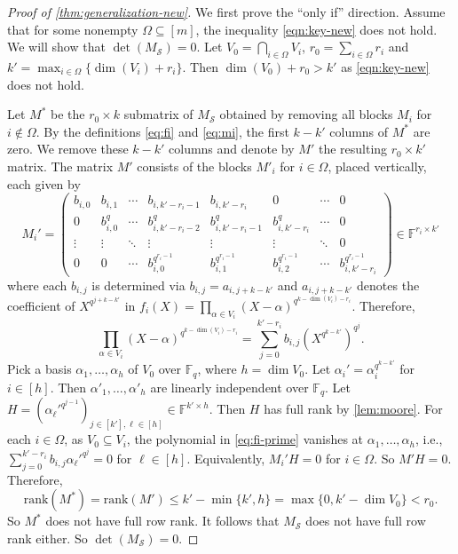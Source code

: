 \documentclass[11pt]{article}
\theoremstyle{plain}
\theoremstyle{definition}
\theoremstyle{remark}
\newcommand{\F}{\mathbb{F}}
\newcommand{\cS}{\mathcal{S}}
\newcommand{\rank}{\mathrm{rank}}
\begin{document}
\begin{proof}[Proof of \cref{thm:generalization-new}]
We first prove the ``only if'' direction.
Assume that for some nonempty $\Omega\subseteq [m]$, the inequality \eqref{eqn:key-new} does not hold. We will show that $\det(M_{\cS})=0$.
Let $V_0=\bigcap_{i\in \Omega}V_i$, $r_0=\sum_{i\in \Omega}r_i$ and $k'=\max_{i\in \Omega}\{\dim(V_i)+r_i\}$. Then $\dim(V_0)+r_0>k'$ as \eqref{eqn:key-new} does not hold. 

Let $M^*$ be the  $r_0\times k$ submatrix of $M_{\cS}$ obtained by removing all blocks $M_i$ for $i\notin \Omega$. 
By the definitions \eqref{eq:fi} and \eqref{eq:mi}, the first $k-k'$ columns of $M^*$ are zero. We remove these $k-k'$ columns and denote by $M'$ the resulting $r_0\times k'$ matrix. The matrix $M'$ consists of the blocks $M'_i$ for $i\in \Omega$, placed vertically, each given by
\begin{equation}\label{eq:mi-prime}
M_i'=\begin{pmatrix}
b_{i,0}&b_{i,1}&\cdots& b_{i,k'-r_i-1} & b_{i,k'-r_i}&  0 & \cdots &0   \\
0 &b_{i,0}^q& \cdots  & b_{i,k'-r_i-2}^q & b_{i,k'-r_i-1}^q & b_{i,k'-r_i}^q & \cdots &0 \\
\vdots & \vdots &\ddots & \vdots &\vdots &\vdots& \ddots &0\\
0 &0  & \cdots &b_{i,0}^{q^{r_i-1}} & b_{i,1}^{q^{r_i-1}} & b_{i,2}^{q^{r_i-1}} &\cdots & b_{i,k'-r_i}^{q^{r_i-1}} 
\end{pmatrix}\in\mathbb{F}^{r_i\times k'}
\end{equation}
where each $b_{i,j}$ is determined via  $b_{i,j}=a_{i,j+k-k'}$ and $a_{i,j+k-k'}$ denotes the coefficient of $X^{q^{j+k-k'}}$ in $f_i(X)=\prod_{\alpha\in V_i}(X-\alpha)^{q^{k-\dim(V_i)-r_i}}$. Therefore,
\begin{equation}\label{eq:fi-prime}
\prod_{\alpha\in V_i}(X-\alpha)^{q^{k-\dim(V_i)-r_i}}=\sum_{j=0}^{k'-r_i}b_{i,j}\left(X^{q^{k-k'}}\right)^{q^j}.
\end{equation}
Pick a basis $\alpha_1,\dots,\alpha_h$ of $V_0$ over $\F_q$, where $h=\dim V_0$.
Let $\alpha_i'=\alpha_i^{q^{k-k'}}$ for $i\in [h]$.
Then $\alpha'_1,\dots,\alpha'_h$ are linearly independent over $\F_q$. 
Let $H=(\alpha_{\ell}'^{q^{j-1}})_{j\in [k'], \ell\in [h]}\in\F^{k'\times h}$. Then $H$ has full rank by \cref{lem:moore}.
For each $i\in \Omega$,
as $V_0\subseteq V_i$, the polynomial in 
\eqref{eq:fi-prime} vanishes at $\alpha_1,\dots,\alpha_h$, i.e., $\sum_{j=0}^{k'-r_i}b_{i,j}\alpha_{\ell}'^{q^j}=0$ for $\ell\in [h]$. Equivalently, $M_i' H=0$ for $i\in \Omega$. So $M' H=0$.
Therefore,
\[
\rank(M^*)=\rank(M')\leq k'-\min\{k', h\}=\max\{0, k'-\dim V_0\}<r_0.
\]
So $M^*$ does not have full row rank. It follows that $M_{\cS}$ does not have full row rank either. So $\det(M_{\cS})=0$.


\end{proof}
\end{document}
